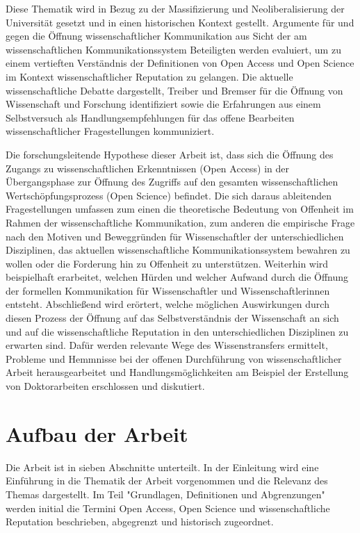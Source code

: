 Diese Thematik wird in Bezug zu der Massifizierung und Neoliberalisierung der Universität gesetzt und in einen historischen Kontext gestellt. Argumente für und gegen die Öffnung wissenschaftlicher Kommunikation aus Sicht der am wissenschaftlichen Kommunikationssystem Beteiligten werden evaluiert, um zu einem vertieften Verständnis der Definitionen von Open Access und Open Science im Kontext wissenschaftlicher Reputation zu gelangen. Die aktuelle wissenschaftliche Debatte dargestellt, Treiber und Bremser für die Öffnung von Wissenschaft und Forschung identifiziert sowie die Erfahrungen aus einem Selbstversuch als Handlungsempfehlungen für das offene Bearbeiten wissenschaftlicher Fragestellungen kommuniziert.

Die forschungsleitende Hypothese dieser Arbeit ist, dass sich die Öffnung des Zugangs zu wissenschaftlichen Erkenntnissen (Open Access) in der Übergangsphase zur Öffnung des Zugriffs auf den gesamten wissenschaftlichen Wertschöpfungsprozess (Open Science) befindet. Die sich daraus ableitenden Fragestellungen umfassen zum einen die theoretische Bedeutung von Offenheit im Rahmen der wissenschaftliche Kommunikation, zum anderen die empirische Frage nach den Motiven und Beweggründen für Wissenschaftler der unterschiedlichen Disziplinen, das aktuellen wissenschaftliche Kommunikationssystem bewahren zu wollen oder die Forderung hin zu Offenheit zu unterstützen. Weiterhin wird beispielhaft erarbeitet, welchen Hürden und welcher Aufwand durch die Öffnung der formellen Kommunikation für Wissenschaftler und Wissenschaftlerinnen entsteht. Abschließend wird erörtert, welche möglichen Auswirkungen durch diesen Prozess der Öffnung auf das Selbstverständnis der Wissenschaft an sich und auf die wissenschaftliche Reputation in den unterschiedlichen Disziplinen zu erwarten sind. Dafür werden relevante Wege des Wissenstransfers ermittelt, Probleme und Hemmnisse bei der offenen Durchführung von wissenschaftlicher Arbeit herausgearbeitet und Handlungsmöglichkeiten am Beispiel der Erstellung von Doktorarbeiten erschlossen und diskutiert.

\section{Aufbau der Arbeit}

Die Arbeit ist in sieben Abschnitte unterteilt. In der Einleitung wird eine Einführung in die Thematik der Arbeit vorgenommen und die Relevanz des Themas dargestellt. Im Teil "Grundlagen, Definitionen und Abgrenzungen" werden initial die Termini Open Access, Open Science und wissenschaftliche Reputation beschrieben, abgegrenzt und historisch zugeordnet.

